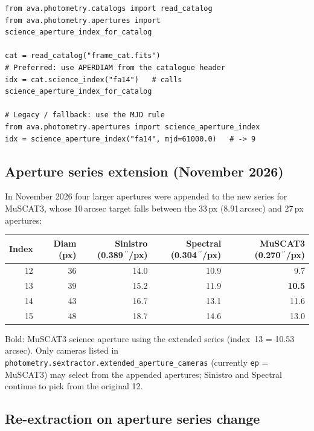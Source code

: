 \documentclass[12pt,a4paper]{article}
\begin{document}
\begin{lstlisting}[style=python]
from ava.photometry.catalogs import read_catalog
from ava.photometry.apertures import science_aperture_index_for_catalog

cat = read_catalog("frame_cat.fits")
# Preferred: use APERDIAM from the catalogue header
idx = cat.science_index("fa14")   # calls science_aperture_index_for_catalog

# Legacy / fallback: use the MJD rule
from ava.photometry.apertures import science_aperture_index
idx = science_aperture_index("fa14", mjd=61000.0)   # -> 9
\end{lstlisting}

\subsection{Aperture series extension (November 2026)}
\label{sec:aper-extension}

In November 2026 four larger apertures were appended to the new series for
MuSCAT3, whose 10\,arcsec target falls between the 33\,px (8.91\,arcsec)
and 27\,px apertures:

\begin{center}
\small
\begin{tabular}{rr rrr}
\toprule
Index & Diam (px) & Sinistro (0.389\,\ensuremath{^{\prime\prime}}/px) & Spectral (0.304\,\ensuremath{^{\prime\prime}}/px) & MuSCAT3 (0.270\,\ensuremath{^{\prime\prime}}/px) \\
\midrule
 12 & 36 & 14.0 & 10.9 & 9.7 \\
 13 & 39 & 15.2 & 11.9 & \textbf{10.5} \\
 14 & 43 & 16.7 & 13.1 & 11.6 \\
 15 & 48 & 18.7 & 14.6 & 13.0 \\
\bottomrule
\end{tabular}
\end{center}

Bold: MuSCAT3 science aperture using the extended series (index~13 = 10.53\,arcsec).
Only cameras listed in \texttt{photometry.sextractor.extended\_\hspace{0pt}aperture\_\hspace{0pt}cameras}
(currently \texttt{ep} = MuSCAT3) may select from the appended apertures;
Sinistro and Spectral continue to pick from the original 12.

\subsection{Re-extraction on aperture series change}
\end{document}
